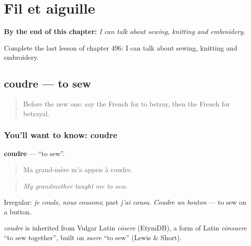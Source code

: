 
\chapter{Fil et aiguille}
\label{ch:fr-fil-et-aiguille}

\begin{chapteropening}
\textbf{By the end of this chapter:} \emph{I can talk about sewing, knitting and embroidery.}

Complete the last lesson of chapter 496: I can talk about sewing, knitting and embroidery.
\end{chapteropening}

\section[coudre]{coudre — to sew}

\label{lesson:FR-C496-coudre}



\begin{quote}
Before the new one: say the French for to betray, then the French for betrayal.
\end{quote}

\subsection*{You'll want to know: coudre}
\textbf{coudre} — \textquotedblleft{}to sew\textquotedblright{}.

\begin{quote}
Ma grand-mère m'a appris à coudre.
\end{quote}

\begin{quote}
\emph{My grandmother taught me to sew.}
\end{quote}

Irregular: \emph{je couds, nous cousons}; past \emph{j'ai cousu}. \emph{Coudre un bouton} — to sew on a button.

\begin{cousinweb}
\emph{coudre} is inherited from Vulgar Latin \emph{cōsere} (EtymDB), a form of Latin \emph{cōnsuere} \textquotedblleft{}to sew together\textquotedblright{}, built on \emph{suere} \textquotedblleft{}to sew\textquotedblright{} (Lewis \& Short).
\end{cousinweb}

